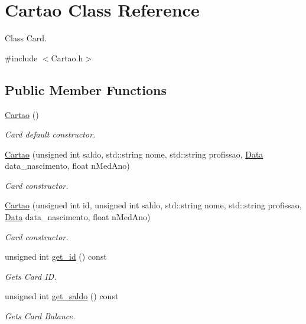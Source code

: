\hypertarget{class_cartao}{}\section{Cartao Class Reference}
\label{class_cartao}


Class Card.  




{\ttfamily \#include $<$Cartao.\+h$>$}

\subsection*{Public Member Functions}
\begin{DoxyCompactItemize}
\item 
\mbox{\label{class_cartao_a386e002603b70d4eb31ff5b9ad61607f}} 
\hyperlink{class_cartao_a386e002603b70d4eb31ff5b9ad61607f}{Cartao} ()
\begin{DoxyCompactList}\small\item\em Card default constructor. \end{DoxyCompactList}\item 
\hyperlink{class_cartao_a7095e59abc099b24789659999babce6e}{Cartao} (unsigned int saldo, std\+::string nome, std\+::string profissao, \hyperlink{class_data}{Data} data\+\_\+nascimento, float n\+Med\+Ano)
\begin{DoxyCompactList}\small\item\em Card constructor. \end{DoxyCompactList}\item 
\hyperlink{class_cartao_a7fc85ca515dad34b345e957b527f16f8}{Cartao} (unsigned int id, unsigned int saldo, std\+::string nome, std\+::string profissao, \hyperlink{class_data}{Data} data\+\_\+nascimento, float n\+Med\+Ano)
\begin{DoxyCompactList}\small\item\em Card constructor. \end{DoxyCompactList}\item 
unsigned int \hyperlink{class_cartao_a3126a2a75dc75c4bd77957ae3faea277}{get\+\_\+id} () const
\begin{DoxyCompactList}\small\item\em Gets Card ID. \end{DoxyCompactList}\item 
unsigned int \hyperlink{class_cartao_ae3ea4d5846e25c43b0d7ea0c03217213}{get\+\_\+saldo} () const
\begin{DoxyCompactList}\small\item\em Gets Card Balance. \end{DoxyCompactList}\item 

\end{DoxyCompactItemize}
